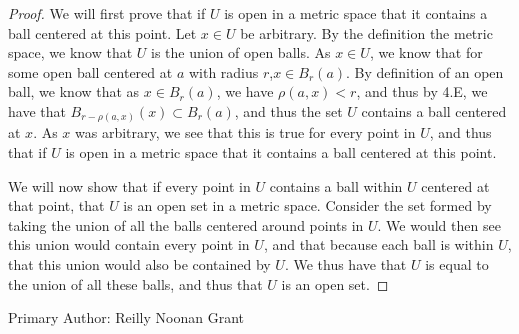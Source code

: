 \begin{proof}
  We will first prove that if $U$ is open in a metric space that it
  contains a ball centered at this point. Let $x \in U$ be arbitrary.
  By the definition the metric space, we know that $U$
  is the union of open balls. As $x \in U$, we know that for some open
  ball centered at $a$ with radius $r$,$x \in B_r(a)$. By definition
  of an open ball, we know that as $x \in B_r(a)$, we have
  $\rho(a,x)<r$, and thus by 4.E, we have that
  $B_{r-\rho(a,x)}(x)\subset B_r(a)$, and thus  the set $U$ contains a
  ball centered at $x$. As $x$ was arbitrary, we see that this is true
  for every point in $U$, and thus that if $U$ is open in a metric space that it
  contains a ball centered at this point.

  We will now show that if every point in $U$ contains a ball within $U$ centered
  at that point, that $U$ is an open set in a metric space. Consider
  the set formed by taking the union of all the balls centered around
  points in $U$. We would then see this union would contain every
  point in $U$, and that because each ball is within $U$, that this
  union would also be contained by $U$. We thus have that $U$ is equal
  to the union of all these balls, and thus that $U$ is an open set.
\end{proof}
Primary Author: Reilly Noonan Grant